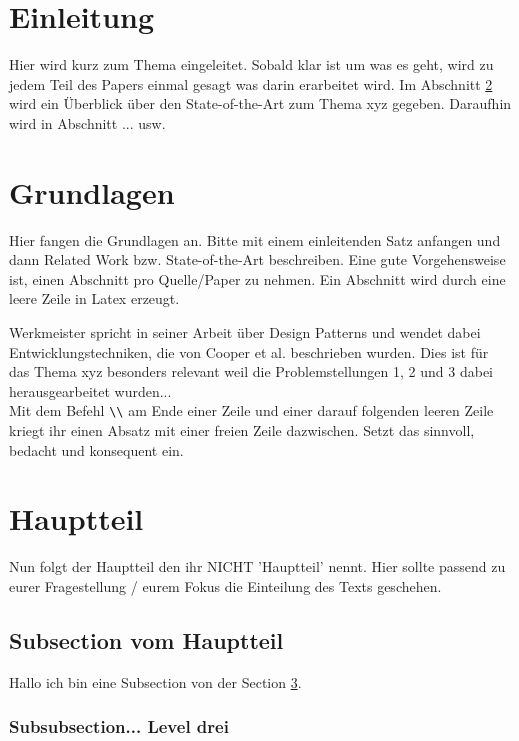 
\section{Einleitung}
Hier wird kurz zum Thema eingeleitet.
Sobald klar ist um was es geht, wird zu jedem Teil des Papers einmal gesagt was darin erarbeitet wird.
Im Abschnitt \ref{grundlagen} wird ein Überblick über den State-of-the-Art zum Thema xyz gegeben.
Daraufhin wird in Abschnitt ... usw.

\section{Grundlagen} \label{grundlagen}
Hier fangen die Grundlagen an.
Bitte mit einem einleitenden Satz anfangen und dann Related Work bzw. State-of-the-Art beschreiben.
Eine gute Vorgehensweise ist, einen Abschnitt pro Quelle/Paper zu nehmen.
Ein Abschnitt wird durch eine leere Zeile in Latex erzeugt.

Werkmeister \cite{dbt_mods_00050711} spricht in seiner Arbeit über Design Patterns und wendet dabei Entwicklungstechniken, die von Cooper et al. \cite{interactionDesign} beschrieben wurden.
Dies ist für das Thema xyz besonders relevant weil die Problemstellungen 1, 2 und 3 dabei herausgearbeitet wurden...\\

Mit dem Befehl \texttt{\textbackslash \textbackslash} am Ende einer Zeile und einer darauf folgenden leeren Zeile kriegt ihr einen Absatz mit einer freien Zeile dazwischen.
Setzt das sinnvoll, bedacht und konsequent ein.


\section{Hauptteil} \label{hauptteil}
Nun folgt der Hauptteil den ihr NICHT 'Hauptteil' nennt.
Hier sollte passend zu eurer Fragestellung / eurem Fokus die Einteilung des Texts geschehen.

\subsection{Subsection vom Hauptteil} \label{subsectionhauptteil}

Hallo ich bin eine Subsection von der Section  \ref{hauptteil}.

\subsubsection{Subsubsection... Level drei} 

